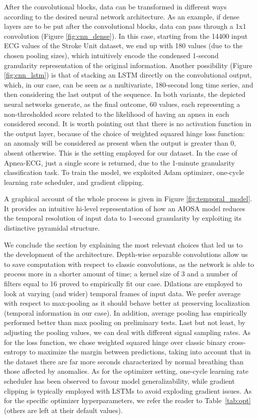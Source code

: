 \documentclass[5p,twocolumn,lefttitle]{elsarticle}
\begin{document}
After the convolutional blocks, data can be transformed in different ways according to the desired neural network architecture. As an example, if dense layers are to be put after the convolutional blocks, data can pass through a 1x1 convolution (Figure \ref{fig:cnn_dense}). In this case, starting from the 14400 input ECG values of the Stroke Unit dataset, we end up with 180 values (due to the chosen pooling sizes), which intuitively encode the condensed 1-second granularity representation of the original information. Another possibility (Figure \ref{fig:cnn_lstm}) is that of stacking an LSTM directly on the convolutional output, which, in our case, can be seen as a multivariate, 180-second long time series, and then considering the last output of the sequence. 
In both variants, the depicted neural networks generate, as the final outcome, 60 values, each representing a non-thresholded score related to the likelihood of having an apnea in each considered second. It is worth pointing out that there is no activation function in the output layer, because of the choice of weighted squared hinge loss function: an anomaly will be considered as present when the output is greater than 0, absent otherwise. This is the setting employed for our dataset. In the case of Apnea-ECG, just a single score is returned, due to the 1-minute granularity classification task. To train the model, we exploited Adam optimizer, one-cycle learning rate scheduler, and gradient clipping. 

A graphical account of the whole process is given in Figure \ref{fig:temporal_model}. It provides an intuitive hi-level representation of how an AIOSA model reduces the temporal resolution of input data to 1-second granularity by exploiting its distinctive pyramidal structure.


We  conclude the section by explaining the most relevant choices that led us to the development of the architecture. Depth-wise separable convolutions allow us to save computation with respect to classic convolutions, as the network is able to process more in a shorter amount of time; a kernel size of 3 and a number of filters equal to 16 proved to empirically fit our case. Dilations are employed to look at varying (and wider) temporal frames of input data. We prefer average with respect to max-pooling as it should behave better at preserving localization (temporal information in our case).  In addition,  average pooling has empirically performed better than max pooling on preliminary tests. Last but not least, by adjusting the pooling values, we can deal with different signal sampling rates. As for the loss function, we chose weighted squared hinge over classic binary cross-entropy to maximize the margin between predictions, taking into account that in the dataset there are far more seconds characterized by normal breathing than those affected by anomalies.  As for the optimizer setting, one-cycle learning rate scheduler has been observed to favour model generalizability, while gradient clipping is typically employed with LSTMs to avoid exploding gradient issues. 
As for the specific optimizer hyperparameters, we refer the reader to Table~\ref{tab:opt} (others are left at their default values).
\end{document}
